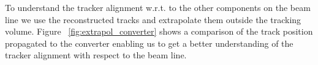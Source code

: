 
To understand the tracker alignment w.r.t. to the other components on the beam line we 
use the reconstructed tracks and extrapolate them outside the tracking volume. 
Figure ~\ref{fig:extrapol_converter} shows a comparison of the track position propagated 
to the converter enabling us to get a better understanding of the tracker alignment with 
respect to the beam line. 
